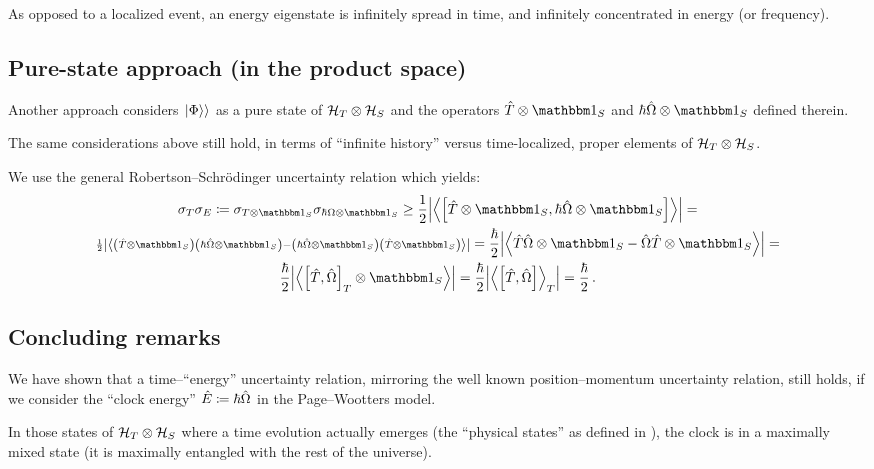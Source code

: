 As opposed to a localized event, an energy eigenstate is infinitely spread in time,
and infinitely concentrated in energy (or frequency).

\subsection*{Pure-state approach (in the product space)}\label{sec:pure-state-approach}

Another approach considers $\left.\left| \Phi \right\rangle\right\rangle$ as a pure state of $\mathcal{H}_T \otimes \mathcal{H}_S$
and the operators $\hat{T} \ox \idop_{S}$ and $\hbar\hat{\Omega} \ox \idop_{S}$
defined therein.

The same considerations above still hold, in terms of ``infinite history'' versus
time-localized, proper elements of $\mathcal{H}_T \otimes \mathcal{H}_S$. 

We use the general Robertson--Schr\"{o}dinger uncertainty relation which yields:
\begin{multline}
  \sigma_T \sigma_E \eqbydef
  \sigma_{T \ox \idop_S} \sigma_{\hbar\Omega \ox \idop_S} \geq
  \frac{1}{2} \abs{\expval{\comm
    {\hat{T}\ox\idop_S} {\hbar\hat{\Omega}\ox\idop_S}
  }} =
  \\
  {\scriptstyle
    \frac{1}{2} \abs{\expval{
      \qty(\hat{T}\ox\idop_S) \qty(\hbar\hat{\Omega}\ox\idop_S) -
      \qty(\hbar\hat{\Omega}\ox\idop_S) \qty(\hat{T}\ox\idop_S)
    }}
  } =
  \frac{\hbar}{2} \abs{\expval{
    \hat{T}\hat{\Omega}\ox\idop_S - \hat{\Omega}\hat{T}\ox\idop_S
  }} = \\
  \frac{\hbar}{2} \abs{\expval{
    \comm{\hat{T}}{\hat{\Omega}}_T \ox \idop_S
  }} =
  \frac{\hbar}{2} \abs{\expval{\comm
    {\hat{T}}{\hat{\Omega}}
  }_T} =
  \frac{\hbar}{2}
  \,\text{.}
\end{multline}

\subsection*{Concluding remarks}

We have shown that a time--``energy'' uncertainty relation,
mirroring the well known position--momentum uncertainty relation,
still holds, if we consider the ``clock energy'' $\hat{E} \coloneqq \hbar\hat{\Omega}$
in the Page--Wootters model.

In those states of $\mathcal{H}_T \otimes \mathcal{H}_S$ where a time evolution actually emerges
(the ``physical states'' as defined in \cite{Lloyd:Time}),
the clock is in a maximally mixed state
(it is maximally entangled with the rest of the universe).


